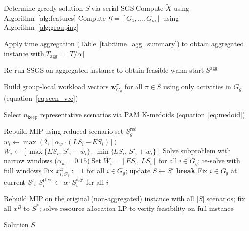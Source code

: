 \begin{algorithm}[H]
\caption{Group-based R\&F with time aggregation and
         per-group scenario reduction}
\label{alg:group_rf_extended}
\begin{algorithmic}[1]
\State Determine greedy solution $S$ via serial SGS
\State Compute $\tilde{X}$ using Algorithm~\ref{alg:features}
\State Compute $\mathcal{G}=[G_1,\ldots,G_m]$
       using Algorithm~\ref{alg:grouping}
    \State \parbox[t]{0.80\linewidth}{%
           Apply time aggregation
           (Table~\ref{tab:time_agg_summary}) to obtain
           aggregated instance with
           $T_{\mathrm{agg}} = \lceil T/\alpha \rceil$}
    \State Re-run SSGS on aggregated instance to obtain
           feasible warm-start $S^{\mathrm{agg}}$
\EndIf
{}
        \State \parbox[t]{0.78\linewidth}{%
               Build group-local workload vectors
               $\mathbf{w}_{G_g}^{\pi}$ for all $\pi \in S$
               using only activities in $G_g$
               (equation~\ref{eq:scen_vec})}
        \State \parbox[t]{0.78\linewidth}{%
               Select $n_{\mathrm{keep}}$ representative
               scenarios via PAM K-medoids
               (equation~\ref{eq:medoid})}
        \State Rebuild MIP using reduced scenario set
               $S_g^{\mathrm{red}}$
    \EndIf
        \State $w_i \leftarrow \max(2,\,\lfloor \alpha_w \cdot
               (LS_i-ES_i)\rfloor)$
        \State $\widetilde{W}_i \leftarrow
               [\max\{ES_i,\,S'_i-w_i\},\;
                \min\{LS_i,\,S'_i+w_i\}]$
    \EndFor
    \State Solve subproblem with narrow windows
           ($\alpha_w = 0.15$)
        \State Set $\widetilde{W}_i=[ES_i,\,LS_i]$
               for all $i\in G_g$; re-solve with full windows
    \EndIf
        \State Fix $x^B_{i,S'_i}:=1$ for all $i \in G_g$;\;
               update $S \leftarrow S'$
            \State \textbf{break}
        \EndIf
    \Else
        \State Fix $i\in G_g$ at current $S'_i$
    \EndIf
\EndFor
{}
    \State $S_i^{\mathrm{phys}} \leftarrow \alpha \cdot
           S_i^{\mathrm{agg}}$ for all $i$
\EndIf
{}
    \State \parbox[t]{0.78\linewidth}{%
           Rebuild MIP on the original (non-aggregated) instance
           with all $|S|$ scenarios;
           fix all $x^B$ to $S^*$; solve resource allocation
           LP to verify feasibility on full instance}
\EndIf
\State \Return Solution $S$
\end{algorithmic}
\end{algorithm}

